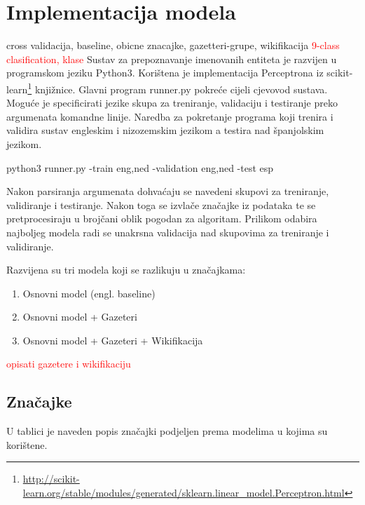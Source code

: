 \documentclass[times, utf8, seminar]{fer}
\newcommand\myworries[1]{\textcolor{red}{#1}}
\begin{document}
\chapter{Implementacija modela}
cross validacija, baseline, obicne znacajke, gazetteri-grupe, wikifikacija
\myworries{9-class clasification, klase}
Sustav za prepoznavanje imenovanih entiteta je razvijen u programskom jeziku Python3. Korištena je implementacija Perceptrona iz scikit-learn\footnote{\url{http://scikit-learn.org/stable/modules/generated/sklearn.linear_model.Perceptron.html}} knjižnice. 
Glavni program runner.py pokreće cijeli cjevovod sustava. Moguće je specificirati jezike skupa za treniranje, validaciju i testiranje preko argumenata komandne linije. Naredba za pokretanje programa koji trenira i validira sustav engleskim i nizozemskim jezikom a testira nad španjolskim jezikom.
\begin{center}
python3 runner.py -train eng,ned -validation eng,ned -test esp
\end{center}

Nakon parsiranja argumenata dohvaćaju se navedeni skupovi za treniranje, validiranje i testiranje. Nakon toga se izvlače značajke iz podataka te se pretprocesiraju u brojčani oblik pogodan za algoritam. Prilikom odabira najboljeg modela radi se unakrsna validacija nad skupovima za treniranje i validiranje. 

Razvijena su tri modela koji se razlikuju u značajkama:
\begin{enumerate}
\item Osnovni model (engl. baseline) 
\item Osnovni model + Gazeteri
\item Osnovni model + Gazeteri + Wikifikacija
\end{enumerate}

\myworries{opisati gazetere i wikifikaciju}
\newpage



\section{Značajke}
U tablici je naveden popis značajki podjeljen prema modelima u kojima su korištene.
\end{document}
